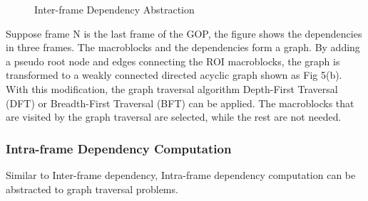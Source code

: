 \begin{figure}
\centering
\quad\quad
{}
\caption{Inter-frame Dependency Abstraction} 
\end{figure}
Suppose frame N is the last frame of the GOP, the figure shows the dependencies in three frames. The macroblocks and the dependencies form a graph. By adding a pseudo root node and edges connecting the ROI macroblocks, the graph is transformed to a weakly connected directed acyclic graph shown as Fig 5(b). With this modification, the graph traversal algorithm Depth-First Traversal (DFT) or Breadth-First Traversal (BFT) can be applied. The macroblocks that are visited by the graph traversal are selected, while the rest are not needed. 

\subsubsection{Intra-frame Dependency Computation} 
Similar to Inter-frame dependency, Intra-frame dependency computation can be abstracted to graph traversal problems. 

